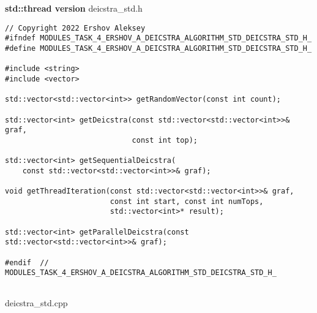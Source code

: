 \documentclass{report}
\begin{document}
\textbf{std::thread version}
\newline
\newline deicstra\_std.h
\begin{lstlisting}
// Copyright 2022 Ershov Aleksey
#ifndef MODULES_TASK_4_ERSHOV_A_DEICSTRA_ALGORITHM_STD_DEICSTRA_STD_H_
#define MODULES_TASK_4_ERSHOV_A_DEICSTRA_ALGORITHM_STD_DEICSTRA_STD_H_

#include <string>
#include <vector>

std::vector<std::vector<int>> getRandomVector(const int count);

std::vector<int> getDeicstra(const std::vector<std::vector<int>>& graf,
                             const int top);

std::vector<int> getSequentialDeicstra(
    const std::vector<std::vector<int>>& graf);

void getThreadIteration(const std::vector<std::vector<int>>& graf,
                        const int start, const int numTops,
                        std::vector<int>* result);

std::vector<int> getParallelDeicstra(const std::vector<std::vector<int>>& graf);

#endif  // MODULES_TASK_4_ERSHOV_A_DEICSTRA_ALGORITHM_STD_DEICSTRA_STD_H_


\end{lstlisting}
deicstra\_std.cpp
\end{document}
